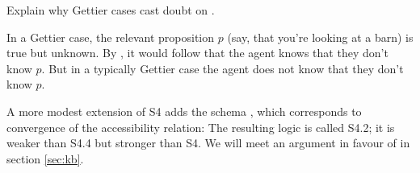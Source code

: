 \begin{exercise}
  Explain why Gettier cases cast doubt on .
\end{exercise}
\begin{solution}
  In a Gettier case, the relevant proposition $p$ (say, that you're looking at a
  barn) is true but unknown. By , it would follow that the agent knows
  that they don't know $p$. But in a typically Gettier case the agent does not
  know that they don't know $p$.
\end{solution}
  
A more modest extension of S4 adds the schema , which corresponds to
convergence of the accessibility relation:
%
%
The resulting logic is called S4.2; it is weaker than S4.4 but stronger than S4.
We will meet an argument in favour of  in section \ref{sec:kb}.


